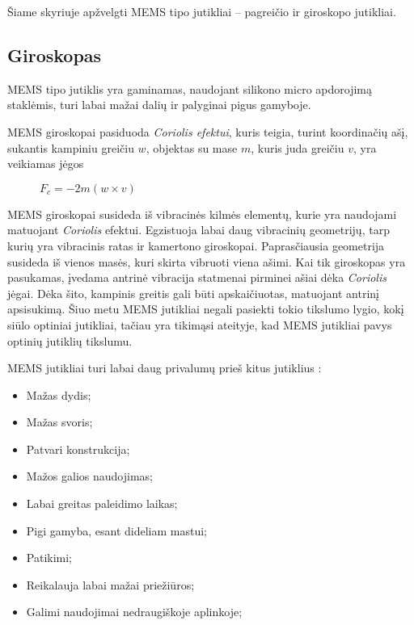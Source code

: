 
Šiame skyriuje apžvelgti MEMS tipo jutikliai -- pagreičio ir giroskopo jutikliai.

\subsection{Giroskopas}

MEMS tipo jutiklis \cite{perlmutter2012high} yra gaminamas, naudojant silikono micro apdorojimą staklėmis, turi labai mažai dalių ir palyginai pigus gamyboje.

MEMS giroskopai pasiduoda \textit{Coriolis efektui}, kuris teigia, turint koordinačių ašį, sukantis kampiniu greičiu $w$, objektas su mase $m$, kuris juda greičiu $v$, yra veikiamas jėgos

\begin{figure}[H]
    \centering
    \begin{math}
        F_c = -2m(w \times v)
    \end{math}
\end{figure}

MEMS giroskopai susideda iš vibracinės kilmės elementų, kurie yra naudojami matuojant \textit{Coriolis} efektui. Egzistuoja labai daug vibracinių geometrijų, tarp kurių yra vibracinis ratas ir kamertono giroskopai. Paprasčiausia geometrija susideda iš vienos masės, kuri skirta vibruoti viena ašimi. Kai tik giroskopas yra pasukamas, įvedama antrinė vibracija statmenai pirminei ašiai dėka \textit{Coriolis} jėgai. Dėka šito, kampinis greitis gali būti apskaičiuotas, matuojant antrinį apsisukimą. Šiuo metu MEMS jutikliai negali pasiekti tokio tikslumo lygio, kokį siūlo optiniai jutikliai, tačiau yra tikimąsi ateityje, kad MEMS jutikliai pavys optinių jutiklių tikslumu.

MEMS jutikliai turi labai daug privalumų prieš kitus jutiklius \cite{titterton2004strapdown}:

\begin{itemize}
    \item Mažas dydis;
    \item Mažas svoris;
    \item Patvari konstrukcija;
    \item Mažos galios naudojimas;
    \item Labai greitas paleidimo laikas;
    \item Pigi gamyba, esant dideliam mastui;
    \item Patikimi;
    \item Reikalauja labai mažai priežiūros;
    \item Galimi naudojimai nedraugiškoje aplinkoje;
\end{itemize}

